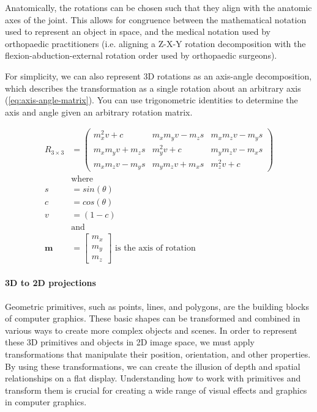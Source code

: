 Anatomically, the rotations can be chosen such that they align with the anatomic axes of the joint. This allows for congruence between the mathematical notation used to represent an object in space, and the medical notation used by orthopaedic practitioners (i.e. aligning a Z-X-Y rotation decomposition with the flexion-abduction-external rotation order used by orthopaedic surgeons).

For simplicity, we can also represent 3D rotations as an axis-angle decomposition, which describes the transformation as a single rotation about an arbitrary axis \cite{craneKinematicAnalysisRobot2008} (\cref{eq:axis-angle-matrix}). You can use trigonometric identities to determine the axis and angle given an arbitrary rotation matrix.

\begin{equation}
    \begin{aligned}
        R_{3 \times 3} &= \begin{pmatrix}
            m_x^2v + c & m_xm_yv - m_zs & m_x m_z v - m_y s \\ m_x m_y v + m_z s & m_y^2 v + c & m_y m_z v - m_x s \\ m_x m_z v - m_y s & m_y m_z v + m_x s & m_z^2 v + c
        \end{pmatrix}\\
        &\text{where} \\
        s &= sin(\theta)\\
        c &= cos(\theta) \\
        v &= (1 - c) \\
        &\text{and}\\
        \mathbf{m} &= \begin{bmatrix}
            m_x \\ m_y \\ m_z
        \end{bmatrix} \text{ is the axis of rotation}
    \end{aligned}
    \label{eq:axis-angle-matrix}
\end{equation}



\paragraph*{3D to 2D projections}
Geometric primitives, such as points, lines, and polygons, are the building blocks of computer graphics. These basic shapes can be transformed and combined in various ways to create more complex objects and scenes. In order to represent these 3D primitives and objects in 2D image space, we must apply transformations that manipulate their position, orientation, and other properties. By using these transformations, we can create the illusion of depth and spatial relationships on a flat display. Understanding how to work with primitives and transform them is crucial for creating a wide range of visual effects and graphics in computer graphics.


